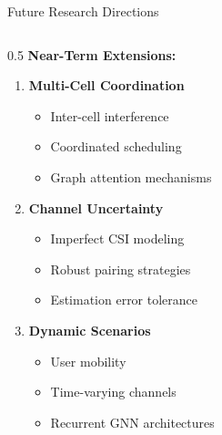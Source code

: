 \documentclass[aspectratio=169]{beamer}
\begin{document}
\begin{frame}{Future Research Directions}
    \begin{columns}
        \begin{column}{0.5\textwidth}
            \textbf{Near-Term Extensions:}
            \begin{enumerate}
                \item \textbf{Multi-Cell Coordination}
                \begin{itemize}
                    \item Inter-cell interference
                    \item Coordinated scheduling
                    \item Graph attention mechanisms
                \end{itemize}
                
                \item \textbf{Channel Uncertainty}
                \begin{itemize}
                    \item Imperfect CSI modeling
                    \item Robust pairing strategies
                    \item Estimation error tolerance
                \end{itemize}
                
                \item \textbf{Dynamic Scenarios}
                \begin{itemize}
                    \item User mobility
                    \item Time-varying channels
                    \item Recurrent GNN architectures
                \end{itemize}
                

\end{enumerate}
\end{column}
\end{columns}
\end{frame}
\end{document}
